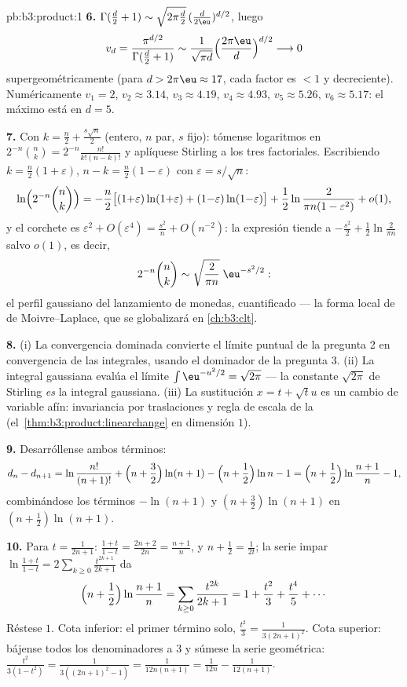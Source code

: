 \begin{solution}{pb:b3:product:1}
\textbf{6.} $\Gamma(\frac d2 + 1) \sim \sqrt{2\pi\frac
d2}\,(\frac d{2\eu})^{d/2}$, luego
\[
v_d = \frac{\pi^{d/2}}{\Gamma(\frac d2 + 1)}
\sim \frac{1}{\sqrt{\pi d}}\Bigl(\frac{2\pi\eu}
d\Bigr)^{d/2} \longrightarrow 0
\]
supergeométricamente (para $d > 2\pi\eu \approx 17$, cada factor es
$< 1$ y decreciente). Numéricamente $v_1 = 2$, $v_2 \approx
3.14$, $v_3 \approx 4.19$, $v_4 \approx 4.93$, $v_5 \approx
5.26$, $v_6 \approx 5.17$: el máximo está en $d = 5$.

\textbf{7.} Con $k = \frac n2 + \frac{s\sqrt n}2$ (entero, $n$ par, $s$
fijo): tómense logaritmos en $2^{-n}\binom nk =
2^{-n}\frac{n!}{k!(n-k)!}$ y aplíquese Stirling a los tres factoriales.
Escribiendo $k = \frac n2(1 + \varepsilon)$, $n - k =
\frac n2(1 - \varepsilon)$ con $\varepsilon = s/\sqrt n$:
\[
\ln\Bigl(2^{-n}\binom nk\Bigr)
= -\frac n2\bigl[(1{+}\varepsilon)\ln(1{+}\varepsilon) +
(1{-}\varepsilon)\ln(1{-}\varepsilon)\bigr]
+ \frac12\ln\frac{2}{\pi n(1 - \varepsilon^2)} + o(1),
\]
y el corchete es $\varepsilon^2 + O(\varepsilon^4) =
\frac{s^2}n + O(n^{-2})$: la expresión tiende a $-\frac{s^2}2 +
\frac12\ln\frac2{\pi n}$ salvo $o(1)$, es decir,
\[
2^{-n}\binom nk \sim \sqrt{\frac{2}{\pi
n}}\;\eu^{-s^2/2} :
\]
el perfil gaussiano del lanzamiento de monedas, cuantificado --- la
forma local de de Moivre--Laplace, que se globalizará en
\cref{ch:b3:clt}.

\textbf{8.} (i) La convergencia dominada convierte el límite puntual de
la pregunta 2 en convergencia de las integrales, usando el dominador de
la pregunta 3. (ii) La integral gaussiana evalúa el límite
$\int\eu^{-u^2/2} = \sqrt{2\pi}$ --- la constante $\sqrt{2\pi}$ de
Stirling \emph{es} la integral gaussiana. (iii) La sustitución
$x = t + \sqrt tu$ es un cambio de variable afín: invariancia por
traslaciones y regla de escala de la
(el~\cref{thm:b3:product:linearchange} en dimensión $1$).

\textbf{9.} Desarróllense ambos términos:
\[
d_n - d_{n+1} = \ln\frac{n!}{(n+1)!} + \Bigl(n +
\frac32\Bigr)\ln(n+1) - \Bigl(n + \frac12\Bigr)\ln n - 1
= \Bigl(n + \frac12\Bigr)\ln\frac{n+1}n - 1,
\]
combinándose los términos $-\ln(n+1)$ y $(n + \frac32)\ln(n+1)$ en
$(n + \frac12)\ln(n+1)$.

\textbf{10.} Para $t = \frac1{2n+1}$: $\frac{1+t}{1-t} =
\frac{2n+2}{2n} = \frac{n+1}n$, y $n + \frac12 =
\frac1{2t}$; la serie impar $\ln\frac{1+t}{1-t} =
2\sum_{k\geq0}\frac{t^{2k+1}}{2k+1}$ da
\[
\Bigl(n + \frac12\Bigr)\ln\frac{n+1}n
= \sum_{k\geq0}\frac{t^{2k}}{2k+1}
= 1 + \frac{t^2}3 + \frac{t^4}5 + \cdots
\]
Réstese $1$. Cota inferior: el primer término solo,
$\frac{t^2}3 = \frac1{3(2n+1)^2}$. Cota superior: bájense todos los
denominadores a $3$ y súmese la serie geométrica:
$\frac{t^2}{3(1 - t^2)} = \frac1{3((2n+1)^2 - 1)} =
\frac1{12n(n+1)} = \frac1{12n} - \frac1{12(n+1)}$.


\end{solution}
